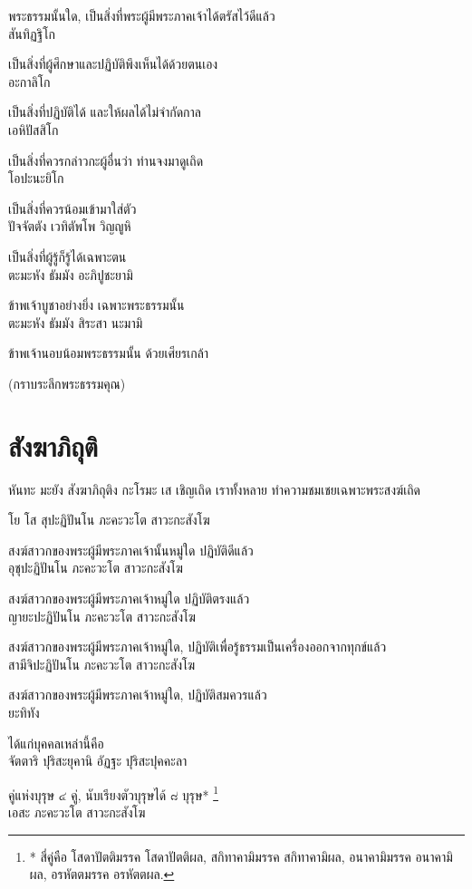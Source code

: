 \documentclass{article}
\begin{document}
พระธรรมนั้นใด, เป็นสิ่งที่พระผู้มีพระภาคเจ้าได้ตรัสไว้ดีแล้ว\\
สันทิฏฐิโก

เป็นสิ่งที่ผู้ศึกษาและปฏิบัติพึงเห็นได้ด้วยตนเอง\\
อะกาลิโก

เป็นสิ่งที่ปฏิบัติได้ และให้ผลได้ไม่จำกัดกาล\\
เอหิปัสสิโก

เป็นสิ่งที่ควรกล่าวกะผู้อื่นว่า ท่านจงมาดูเถิด\\
โอปะนะยิโก

เป็นสิ่งที่ควรน้อมเข้ามาใส่ตัว\\
ปัจจัตตัง เวทิตัพโพ วิญญูหิ

เป็นสิ่งที่ผู้รู้ก็รู้ได้เฉพาะตน\\
ตะมะหัง ธัมมัง อะภิปูชะยามิ

ข้าพเจ้าบูชาอย่างยิ่ง เฉพาะพระธรรมนั้น\\
ตะมะหัง ธัมมัง สิระสา นะมามิ

ข้าพเจ้านอบน้อมพระธรรมนั้น ด้วยเศียรเกล้า
\begin{center}
(กราบระลึกพระธรรมคุณ)
\end{center}
\pagebreak
\section{สังฆาภิถุติ}
\begin{center}
หันทะ มะยัง สังฆาภิถุติง กะโรมะ เส
เชิญเถิด เราทั้งหลาย ทำความชมเชยเฉพาะพระสงฆ์เถิด
\end{center}
โย โส สุปะฏิปันโน ภะคะวะโต สาวะกะสังโฆ

สงฆ์สาวกของพระผู้มีพระภาคเจ้านั้นหมู่ใด ปฏิบัติดีแล้ว\\
อุชุปะฏิปันโน ภะคะวะโต สาวะกะสังโฆ

สงฆ์สาวกของพระผู้มีพระภาคเจ้าหมู่ใด ปฏิบัติตรงแล้ว\\
ญายะปะฏิปันโน ภะคะวะโต สาวะกะสังโฆ

สงฆ์สาวกของพระผู้มีพระภาคเจ้าหมู่ใด, ปฏิบัติเพื่อรู้ธรรมเป็นเครื่องออกจากทุกข์แล้ว\\
สามีจิปะฏิปันโน ภะคะวะโต สาวะกะสังโฆ

สงฆ์สาวกของพระผู้มีพระภาคเจ้าหมู่ใด, ปฏิบัติสมควรแล้ว\\
ยะทิทัง

ได้แก่บุคคลเหล่านี้คือ\\
จัตตาริ ปุริสะยุคานิ อัฏฐะ ปุริสะปุคคะลา

คู่แห่งบุรุษ ๔ คู่, นับเรียงตัวบุรุษได้ ๘ บุรุษ*
\footnote{* สี่คู่คือ โสดาปัตติมรรค โสดาปัตติผล, สกิทาคามิมรรค สกิทาคามิผล,
อนาคามิมรรค อนาคามิผล, อรหัตตมรรค อรหัตตผล.}\\
เอสะ ภะคะวะโต สาวะกะสังโฆ
\end{document}
